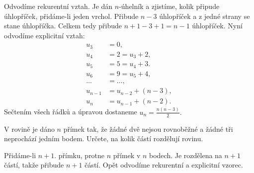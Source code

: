 \begin{reseni}
Odvodíme rekurentní vztah. Je dán $n$-úhelník a zjistíme, kolik připude
úhlopříček, přidáme-li jeden vrchol. Přibude $n-3$ úhlopříček a z jedné strany
se stane úhlopříčka. Celkem tedy přibude $n+1-3+1=n-1$ úhlopříček. Nyní odvodíme
explicitní vztah:
\begin{align*}
    u_3 &= 0,\\
    u_4 &= 2=u_3+2,\\
    u_5 &= 5=u_4+3. \\
    u_6&=9=u_5+4,\\
    \dots &= \dots, \\
    u_{n-1}&=u_{n-2}+(n-3),\\
    u_n &= u_{n-1}+(n-2).
\end{align*}
Sečtením všech řádků a úpravou dostaneme $u_n=\frac{n(n-3)}{2}.$
\end{reseni}

\begin{priklad}
V rovině je dáno $n$ přímek tak, že žádné dvě nejsou rovnoběžné a žádné tři neprochází
jedním bodem. Určete, na kolik částí rozdělují
rovinu.
\end{priklad}

\begin{reseni}
Přidáme-li $n+1.$ přímku, protne $n$ přímek v $n$ bodech. Je rozdělena na
$n+1$ částí, takže přibude $n+1$ částí. Opět odvodíme
rekurentní a explicitní vzorec.
\end{reseni}

